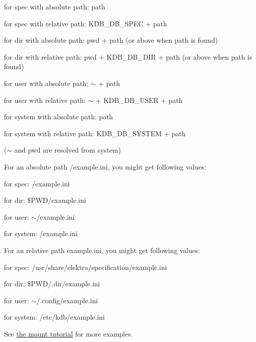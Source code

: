 \begin{DoxyItemize}
\item for spec with absolute path\+: path
\item for spec with relative path\+: {\ttfamily K\+D\+B\+\_\+\+D\+B\+\_\+\+S\+P\+EC} + path
\item for dir with absolute path\+: {\ttfamily pwd} + path (or above when path is found)
\item for dir with relative path\+: {\ttfamily pwd} + {\ttfamily K\+D\+B\+\_\+\+D\+B\+\_\+\+D\+IR} + path (or above when path is found)
\item for user with absolute path\+: {\ttfamily $\sim$} + path
\item for user with relative path\+: {\ttfamily $\sim$} + {\ttfamily K\+D\+B\+\_\+\+D\+B\+\_\+\+U\+S\+ER} + path
\item for system with absolute path\+: path
\item for system with relative path\+: {\ttfamily K\+D\+B\+\_\+\+D\+B\+\_\+\+S\+Y\+S\+T\+EM} + path
\end{DoxyItemize}

($\sim$ and {\ttfamily pwd} are resolved from system)

For an absolute path {\ttfamily /example.ini}, you might get following values\+:


\begin{DoxyItemize}
\item for spec\+: {\ttfamily /example.ini}
\item for dir\+: {\ttfamily \$\+P\+WD/example.ini}
\item for user\+: {\ttfamily $\sim$/example.ini}
\item for system\+: {\ttfamily /example.ini}
\end{DoxyItemize}

For an relative path example.\+ini, you might get following values\+:


\begin{DoxyItemize}
\item for spec\+: {\ttfamily /usr/share/elektra/specification/example.ini}
\item for dir\+: {\ttfamily \$\+P\+WD/.dir/example.\+ini}
\item for user\+: {\ttfamily $\sim$/.config/example.\+ini}
\item for system\+: {\ttfamily /etc/kdb/example.ini}
\end{DoxyItemize}

See \hyperlink{doc_tutorials_mount_md}{the mount tutorial} for more examples.

